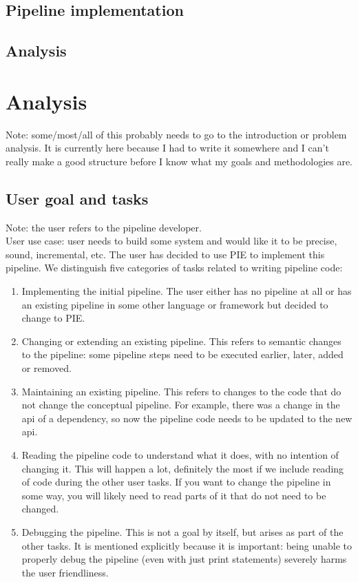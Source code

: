 
\subsection{Pipeline implementation}
\label{sec:evaluation__testing__implementation}


\subsection{Analysis}
\label{sec:evaluation__testing__analysis}


\section{Analysis}
\label{sec:evaluation__analysis}

Note: some/most/all of this probably needs to go to the introduction or problem analysis.
It is currently here because I had to write it somewhere and I can't really make a good structure before I know what my goals and methodologies are.

\subsection{User goal and tasks}
Note: the user refers to the pipeline developer.\\
User use case: user needs to build some system and would like it to be precise, sound, incremental, etc.
The user has decided to use PIE to implement this pipeline.
We distinguish five categories of tasks related to writing pipeline code:
\begin{enumerate}
  \item Implementing the initial pipeline.
  The user either has no pipeline at all or has an existing pipeline in some other language or framework but decided to change to PIE.
  \item Changing or extending an existing pipeline.
  This refers to semantic changes to the pipeline: some pipeline steps need to be executed earlier, later, added or removed.
  \item Maintaining an existing pipeline.
  This refers to changes to the code that do not change the conceptual pipeline.
  For example, there was a change in the api of a dependency, so now the pipeline code needs to be updated to the new api.
  \item Reading the pipeline code to understand what it does, with no intention of changing it.
  This will happen a lot, definitely the most if we include reading of code during the other user tasks.
  If you want to change the pipeline in some way, you will likely need to read parts of it that do not need to be changed.
  \item Debugging the pipeline.
  This is not a goal by itself, but arises as part of the other tasks.
  It is mentioned explicitly because it is important: being unable to properly debug the pipeline (even with just print statements) severely harms the user friendliness.
\end{enumerate}

